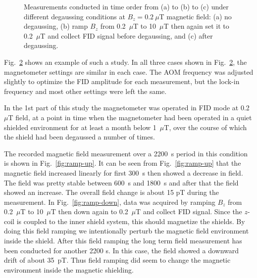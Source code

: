 \begin{figure}
\begin{subfigure}[b]{0.48\textwidth}
    \caption{}
    \label{fig:degauss}
  \end{subfigure}
  \caption{Measurements conducted in time order from (a) to (b) to (c)
    under different degaussing conditions at $B_z=0.2~\mu$T magnetic
    field: (a) no degaussing, (b) ramp $B_z$ from 0.2~$\mu$T to
    10~$\mu$T then again set it to 0.2~$\mu$T and collect FID signal
    before degaussing, and (c) after degaussing.}
  \label{fig:ramp-updown}
\end{figure}

Fig.~\ref{fig:ramp-updown} shows an example of such a study.  In all
three cases shown in Fig.~\ref{fig:ramp-updown}, the magnetometer
settings are similar in each case.  The AOM frequency was adjusted
slightly to optimize the FID amplitude for each measurement, but the
lock-in frequency and most other settings were left the same.
  
In the 1st part of this study the magnetometer was operated in FID
mode at 0.2~$\mu$T field, at a point in time when the magnetometer had
been operated in a quiet shielded environment for at least a month
below 1~$\mu$T, over the course of which the shield had been degaussed
a number of times.
  
The recorded magnetic field measurement over a 2200~s period in this
condition is shown in Fig.~\ref{fig:ramp-up}.  It can be seen from
Fig.~\ref{fig:ramp-up} that the magnetic field increased linearly for
first 300~s then showed a decrease in field. The field was pretty
stable between 600~s and 1800~s and after that the field showed an
increase. The overall field change is about 15 pT during the
measurement.  In Fig.~\ref{fig:ramp-down}, data was acquired by
ramping $B_z$ from 0.2~$\mu$T to 10~$\mu$T then down again to
0.2~$\mu$T and collect FID signal.  Since the $z$-coil is coupled to
the inner shield system, this should magnetize the shields.  By doing
this field ramping we intentionally perturb the magnetic field
environment inside the shield.  After this field ramping the long term
field measurement has been conducted for another 2200 s. In this case,
the field showed a downward drift of about 35~pT.  Thus field ramping
did seem to change the magnetic environment inside the magnetic
shielding.

